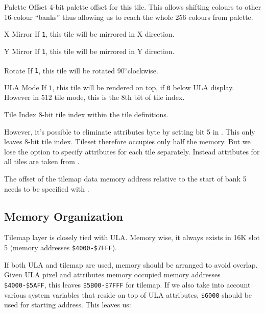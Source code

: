 \documentclass[12pt,twoside,openright,a4paper]{book}
\newcommand{\Deg}{\textsuperscript{o}}
\begin{document}
\begin{basedescript}{
	\desclabelstyle{\multilinelabel}
	\desclabelwidth{3cm}}
	\setlength\itemsep{0pt}

	\newcommand{\RightItem}[1]{\item[#1]}

	\RightItem{Palette Offset} 4-bit palette offset for this tile. This allows shifting colours to other 16-colour ``banks'' thus allowing us to reach the whole 256 colours from palette.
	
	\RightItem{X Mirror} If {\tt 1}, this tile will be mirrored in X direction.

	\RightItem{Y Mirror} If {\tt 1}, this tile will be mirrored in Y direction.
	
	\RightItem{Rotate} If {\tt 1}, this tile will be rotated 90\Deg clockwise.
	
	\RightItem{ULA Mode} If {\tt 1}, this tile will be rendered on top, if {\tt 0} below ULA display. However in 512 tile mode, this is the 8th bit of tile index.
	
	\RightItem{Tile Index} 8-bit tile index within the tile definitions.
\end{basedescript}

However, it's possible to eliminate attributes byte by setting bit 5 in . This only leaves 8-bit tile index. Tileset therefore occupies only half the memory. But we lose the option to specify attributes for each tile separately. Instead attributes for all tiles are taken from .

The offset of the tilemap data memory address relative to the start of bank 5 needs to be specified with .


\subsection{Memory Organization}

Tilemap layer is closely tied with ULA. Memory wise, it always exists in 16K slot 5 (memory addresses {\tt \$4000-\$7FFF}).

If both ULA and tilemap are used, memory should be arranged to avoid overlap. Given ULA pixel and attributes memory occupied memory addresses {\tt \$4000-\$5AFF}, this leaves {\tt \$5B00-\$7FFF} for tilemap. If we also take into account various system variables that reside on top of ULA attributes, {\tt \$6000} should be used for starting address. This leaves us:
\end{document}
